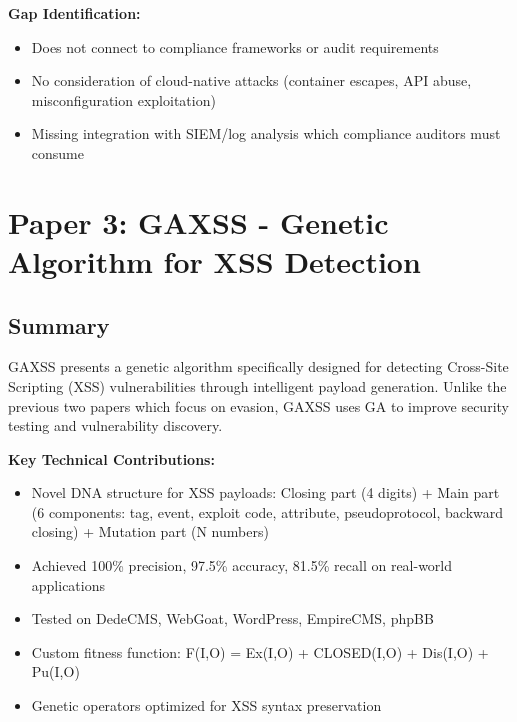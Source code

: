 \documentclass[11pt,conference]{IEEEtran}
\begin{document}
\textbf{Gap Identification:}
\begin{itemize}
    \item Does not connect to compliance frameworks or audit requirements
    \item No consideration of cloud-native attacks (container escapes, API abuse, misconfiguration exploitation)
    \item Missing integration with SIEM/log analysis which compliance auditors must consume
\end{itemize}

\section{Paper 3: GAXSS - Genetic Algorithm for XSS Detection}

\subsection{Summary}

GAXSS presents a genetic algorithm specifically designed for detecting Cross-Site Scripting (XSS) vulnerabilities through intelligent payload generation. Unlike the previous two papers which focus on evasion, GAXSS uses GA to improve security testing and vulnerability discovery.

\textbf{Key Technical Contributions:}
\begin{itemize}
    \item Novel DNA structure for XSS payloads: Closing part (4 digits) + Main part (6 components: tag, event, exploit code, attribute, pseudoprotocol, backward closing) + Mutation part (N numbers)
    \item Achieved 100\% precision, 97.5\% accuracy, 81.5\% recall on real-world applications
    \item Tested on DedeCMS, WebGoat, WordPress, EmpireCMS, phpBB
    \item Custom fitness function: F(I,O) = Ex(I,O) + CLOSED(I,O) + Dis(I,O) + Pu(I,O)
    \item Genetic operators optimized for XSS syntax preservation
\end{itemize}
\end{document}

